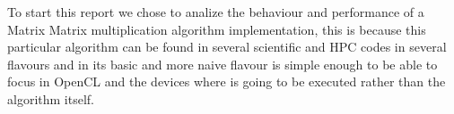 \par{To start this report we chose to analize the behaviour and performance of a Matrix Matrix multiplication algorithm 
    implementation, this is because this particular algorithm can be found in several scientific and HPC codes in several flavours
    and in its basic and more naive flavour is simple enough to be able to focus in OpenCL and the devices where is going to be 
    executed rather than the algorithm itself.}

